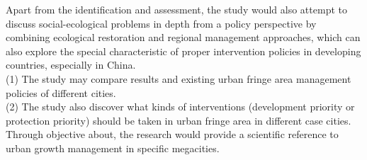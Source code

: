 Apart from the identification and assessment, the study would also attempt to discuss social-ecological problems in depth from a policy perspective by combining ecological restoration and regional management approaches, which can also explore the special characteristic of proper intervention policies in developing countries, especially in China.\\

(1) The study may compare results and existing urban fringe area management policies of different cities.\\ 
(2) The study also discover what kinds of interventions (development priority or protection priority) should be taken in urban fringe area in different case cities.\\

Through objective about, the research would provide a scientific reference to urban growth management in specific megacities. 

